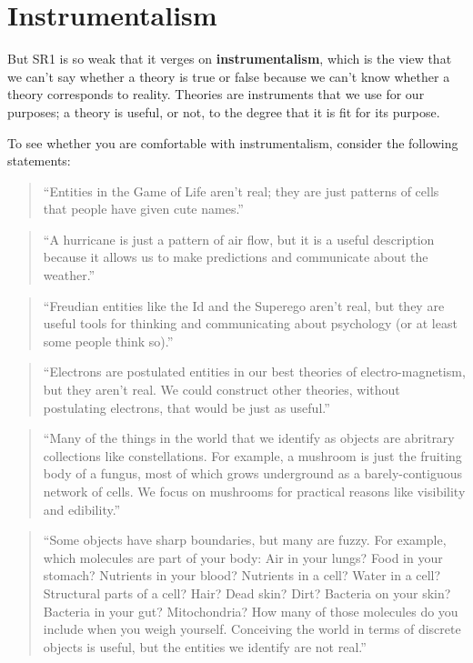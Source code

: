 \documentclass[10pt]{book}
\begin{document}
\section{Instrumentalism}

But SR1 is so weak that it verges on {\bf instrumentalism}, which is
the view that we can't say whether a theory is true or false because
we can't know whether a theory corresponds to reality.  Theories are
instruments that we use for our purposes; a theory is useful, or not,
to the degree that it is fit for its purpose.

To see whether you are comfortable with instrumentalism, consider
the following statements:

\begin{quote}
``Entities in the Game of Life aren't real; they are just patterns of
  cells that people have given cute names.''
\end{quote}

\begin{quote}
``A hurricane is just a pattern of air flow, but it is a useful
  description because it allows us to make predictions and communicate
  about the weather.''
\end{quote}

\begin{quote}
``Freudian entities like the Id and the Superego aren't real, but they
  are useful tools for thinking and communicating about psychology (or
  at least some people think so).''
\end{quote}

\begin{quote}
``Electrons are postulated entities in our best theories of
electro-magnetism, but they aren't real.  We could construct
other theories, without postulating electrons, that would be
just as useful.''
\end{quote}

\begin{quote}
``Many of the things in the world that we identify as objects are
  abritrary collections like constellations.  For example, a mushroom
  is just the fruiting body of a fungus, most of which grows
  underground as a barely-contiguous network of cells.  We focus
  on mushrooms for practical reasons like visibility and edibility.''
\end{quote}

\begin{quote}
``Some objects have sharp boundaries, but many are fuzzy.  For
  example, which molecules are part of your body: Air in your lungs?
  Food in your stomach?  Nutrients in your blood?  Nutrients in a
  cell?  Water in a cell?  Structural parts of a cell?  Hair?  Dead
  skin?  Dirt?  Bacteria on your skin?  Bacteria in your gut?
  Mitochondria?  How many of those molecules do you include when you
  weigh yourself.  Conceiving the world in terms of discrete objects
  is useful, but the entities we identify are not real.''
\end{quote}
\end{document}
